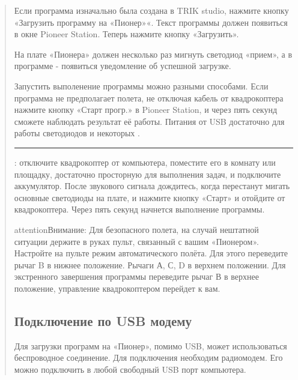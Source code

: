 \documentclass[a4paper,10pt,russian]{sphinxmanual}
\begin{document}
\begin{quote}
Если программа изначально была создана в TRIK studio, нажмите кнопку «Загрузить программу на «Пионер»«. Текст программы должен появиться в окне Pioneer Station. Теперь нажмите кнопку «Загрузить».


На плате «Пионера» должен несколько раз мигнуть светодиод «прием», а в программе - появиться уведомление об успешной загрузке.

Запустить выполенение программы можно разными способами. Если программа не предполагает полета, не отключая кабель от квадрокоптера нажмите кнопку «Старт прогр.» в Pioneer Station, и через пять секунд сможете наблюдать результат её работы. Питания от USB достаточно для работы светодиодов и некоторых .


\bigskip\hrule\bigskip


: отключите квадрокоптер от компьютера, поместите его в комнату или площадку, достаточно просторную для выполнения задач, и подключите аккумулятор. После звукового сигнала дождитесь, когда перестанут мигать основные светодиоды на плате, и нажмите кнопку «Старт» и отойдите от квадрокоптера. Через пять секунд начнется выполнение программы.

\begin{sphinxadmonition}{attention}{Внимание:}
Для безопасного полета, на случай нештатной ситуации держите в руках пульт, связанный с вашим «Пионером». Настройте на пульте режим автоматического полёта. Для этого переведите рычаг B в нижнее положение. Рычаги А, С, D \textendash{} в верхнем положении. Для экстренного завершения программы переведите рычаг В в верхнее положение, управление квадрокоптером перейдет к вам.
\end{sphinxadmonition}


\subsection{Подключение по USB модему}
\label{\detokenize{programming/pioneer_station/pioneer_station_usb_modem:usb}}\label{\detokenize{programming/pioneer_station/pioneer_station_usb_modem::doc}}
Для загрузки программ на «Пионер», помимо USB, может использоваться беспроводное соединение. Для подключения необходим радиомодем. Его можно подключить в любой свободный USB порт компьютера.


\end{quote}
\end{document}

